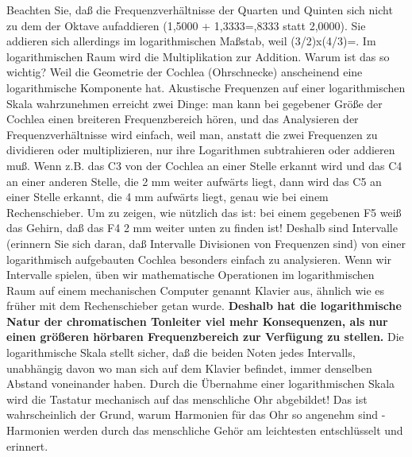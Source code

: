 Beachten Sie, daß die Frequenzverhältnisse der Quarten und Quinten sich nicht zu dem der Oktave aufaddieren (1,5000 + 1,3333\nolinebreak=,8333 statt 2,0000).
 Sie addieren sich allerdings im logarithmischen Maßstab, weil (3/2)x(4/3)\nolinebreak=.
 Im logarithmischen Raum wird die Multiplikation zur Addition.
 Warum ist das so wichtig?
 Weil die Geometrie der Cochlea (Ohrschnecke) anscheinend eine logarithmische Komponente hat.
 Akustische Frequenzen auf einer logarithmischen Skala wahrzunehmen erreicht zwei Dinge: man kann bei gegebener Größe der Cochlea einen breiteren Frequenzbereich hören, und das Analysieren der Frequenzverhältnisse wird einfach, weil man, anstatt die zwei Frequenzen zu dividieren oder multiplizieren, nur ihre Logarithmen subtrahieren oder addieren muß.
 Wenn z.B. das C3 von der Cochlea an einer Stelle erkannt wird und das C4 an einer anderen Stelle, die 2 mm weiter aufwärts liegt, dann wird das C5 an einer Stelle erkannt, die 4 mm aufwärts liegt, genau wie bei einem Rechenschieber.
 Um zu zeigen, wie nützlich das ist: bei einem gegebenen F5 weiß das Gehirn, daß das F4 2 mm weiter unten zu finden ist!
 Deshalb sind Intervalle (erinnern Sie sich daran, daß Intervalle Divisionen von Frequenzen sind) von einer logarithmisch aufgebauten Cochlea besonders einfach zu analysieren.
 Wenn wir Intervalle spielen, üben wir mathematische Operationen im logarithmischen Raum auf einem mechanischen Computer genannt Klavier aus, ähnlich wie es früher mit dem Rechenschieber getan wurde.
 \textbf{Deshalb hat die logarithmische Natur der chromatischen Tonleiter viel mehr Konsequenzen, als nur einen größeren hörbaren Frequenzbereich zur Verfügung zu stellen.}
 Die logarithmische Skala stellt sicher, daß die beiden Noten jedes Intervalls, unabhängig davon wo man sich auf dem Klavier befindet, immer denselben Abstand voneinander haben.
 Durch die Übernahme einer logarithmischen Skala wird die Tastatur mechanisch auf das menschliche Ohr abgebildet!
 Das ist wahrscheinlich der Grund, warum Harmonien für das Ohr so angenehm sind - Harmonien werden durch das menschliche Gehör am leichtesten entschlüsselt und erinnert.
 

